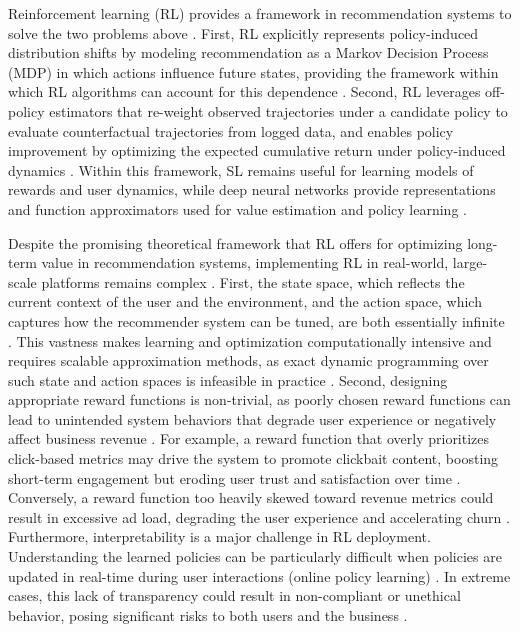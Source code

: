 \documentclass[manuscript,review,screen]{acmart}
\begin{document}
Reinforcement learning (RL) provides a framework in recommendation systems to solve the two problems above \cite{afsar2022reinforcement}. First, RL explicitly represents policy-induced distribution shifts by modeling recommendation as a Markov Decision Process (MDP) in which actions influence future states, providing the framework within which RL algorithms can account for this dependence \cite{Sutton1998}. Second, RL leverages off-policy estimators that re-weight observed trajectories under a candidate policy to evaluate counterfactual trajectories from logged data, and enables policy improvement by optimizing the expected cumulative return under policy-induced dynamics \cite{swaminathan2015counterfactual}. Within this framework, SL remains useful for learning models of rewards and user dynamics, while deep neural networks provide representations and function approximators used for value estimation and policy learning \cite{levine2020offline, Sutton1998}.

Despite the promising theoretical framework that RL offers for optimizing long-term value in recommendation systems, implementing RL in real-world, large-scale platforms remains complex \cite{dulac2021challenges}. First, the state space, which reflects the current context of the user and the environment, and the action space, which captures how the recommender system can be tuned, are both essentially infinite \cite{zhu2021overview}. This vastness makes learning and optimization computationally intensive and requires scalable approximation methods, as exact dynamic programming over such state and action spaces is infeasible in practice \cite{afsar2022reinforcement}. Second, designing appropriate reward functions is non-trivial, as poorly chosen reward functions can lead to unintended system behaviors that degrade user experience or negatively affect business revenue \cite{everitt2021reward}. For example, a reward function that overly prioritizes click-based metrics may drive the system to promote clickbait content, boosting short-term engagement but eroding user trust and satisfaction over time \cite{wu2017returning}. Conversely, a reward function too heavily skewed toward revenue metrics could result in excessive ad load, degrading the user experience and accelerating churn \cite{sagtani2024ad}. Furthermore, interpretability is a major challenge in RL deployment. Understanding the learned policies can be particularly difficult when policies are updated in real-time during user interactions (online policy learning) \cite{glanois2024survey, vouros2022explainable, dulac2021challenges}. In extreme cases, this lack of transparency could result in non-compliant or unethical behavior, posing significant risks to both users and the business \cite{lambert2023entangled}.
\end{document}
